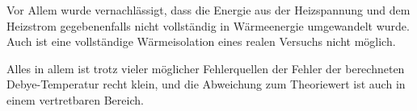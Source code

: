 Vor Allem wurde vernachlässigt, dass die Energie aus der Heizspannung und dem Heizstrom gegebenenfalls 
nicht vollständig in Wärmeenergie umgewandelt wurde. Auch ist eine vollständige Wärmeisolation 
eines realen Versuchs nicht möglich. 

Alles in allem ist trotz vieler möglicher Fehlerquellen der Fehler der berechneten Debye-Temperatur recht klein, 
und die Abweichung zum Theoriewert ist auch in einem vertretbaren Bereich. 

